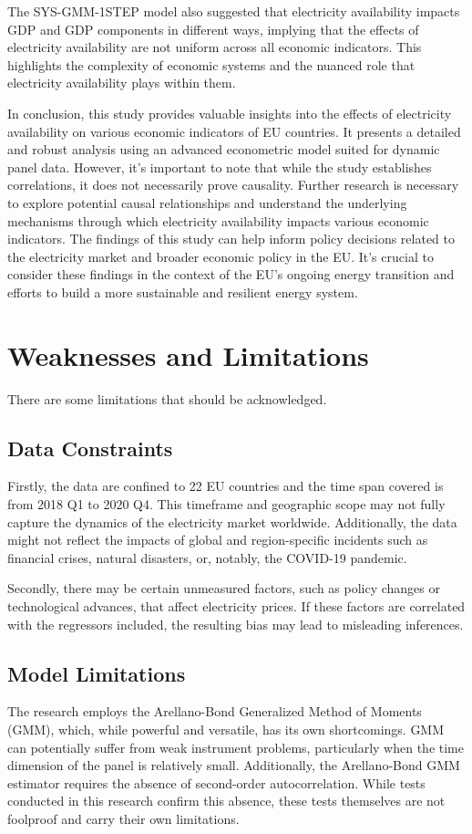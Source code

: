\documentclass[12pt]{article}
\begin{document}
The SYS-GMM-1STEP model also suggested that electricity availability impacts GDP and GDP components in different ways, implying that the effects of electricity availability are not uniform across all economic indicators. This highlights the complexity of economic systems and the nuanced role that electricity availability plays within them.

In conclusion, this study provides valuable insights into the effects of electricity availability on various economic indicators of EU countries. It presents a detailed and robust analysis using an advanced econometric model suited for dynamic panel data. However, it's important to note that while the study establishes correlations, it does not necessarily prove causality. Further research is necessary to explore potential causal relationships and understand the underlying mechanisms through which electricity availability impacts various economic indicators. The findings of this study can help inform policy decisions related to the electricity market and broader economic policy in the EU. It's crucial to consider these findings in the context of the EU's ongoing energy transition and efforts to build a more sustainable and resilient energy system.

\section{Weaknesses and Limitations}
There are some limitations that should be acknowledged.

\subsection{Data Constraints}
Firstly, the data are confined to 22 EU countries and the time span covered is from 2018 Q1 to 2020 Q4. This timeframe and geographic scope may not fully capture the dynamics of the electricity market worldwide. Additionally, the data might not reflect the impacts of global and region-specific incidents such as financial crises, natural disasters, or, notably, the COVID-19 pandemic.

Secondly, there may be certain unmeasured factors, such as policy changes or technological advances, that affect electricity prices. If these factors are correlated with the regressors included, the resulting bias may lead to misleading inferences.

\subsection{Model Limitations}
The research employs the Arellano-Bond Generalized Method of Moments (GMM), which, while powerful and versatile, has its own shortcomings. GMM can potentially suffer from weak instrument problems, particularly when the time dimension of the panel is relatively small. Additionally, the Arellano-Bond GMM estimator requires the absence of second-order autocorrelation. While tests conducted in this research confirm this absence, these tests themselves are not foolproof and carry their own limitations.
\end{document}
